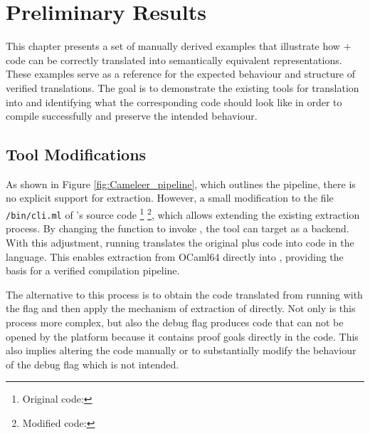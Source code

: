 
%

\chapter{Preliminary Results}
\label{cha:Preliminary_Results}

This chapter presents a set of manually derived examples that illustrate how \ocaml + \gospel code can be correctly translated into 
semantically equivalent \cml representations. These examples serve as a reference for the expected behaviour and structure of verified 
translations. The goal is to demonstrate the existing tools for translation into \cml and identifying what the corresponding \cml code 
should look like in order to compile successfully and preserve the intended behaviour.

\section{Tool Modifications}

As shown in Figure \ref{fig:Cameleer_pipeline}, which outlines the \cameleer pipeline, there is no explicit support for \cml extraction. 
However, a small modification to the file \texttt{/bin/cli.ml} of \cameleer 's source code
\footnote{Original \cameleer code: } 
\footnote{Modified \cameleer code: }, 
which allows extending the existing extraction process. By changing the  function to invoke 
, the tool can target \cml as a backend. With this adjustment, running 
 translates the original \ocaml plus \gospel code into code in the \cml language. 
This enables extraction from \textsf{OCaml64} directly into \cml, providing the basis for a verified compilation pipeline.

The alternative to this process is to obtain the code translated \whyml from running \cameleer with the flag  
and then apply the mechanism of extraction of \whythree directly. Not only is this process more complex, but also the debug flag 
produces code that can not be opened by the \whythree platform because it contains proof goals directly in the code. This also implies
altering the code manually or to substantially modify the behaviour of the debug flag which is not intended.

